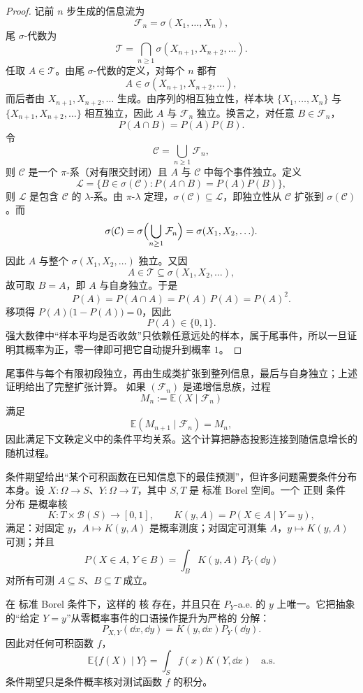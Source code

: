 \begin{proof}
记前 $n$ 步生成的信息流为
\[
\mathcal F_n=\sigma(X_1,\ldots,X_n),
\]
尾 $\sigma$-代数为
\[
\mathcal T=\bigcap_{n\ge1}\sigma(X_{n+1},X_{n+2},\ldots).
\]
任取 $A\in\mathcal T$。由尾 $\sigma$-代数的定义，对每个 $n$ 都有
\[
A\in\sigma(X_{n+1},X_{n+2},\ldots),
\]
而后者由 $X_{n+1},X_{n+2},\ldots$ 生成。由序列的相互独立性，样本块 $\{X_1,\ldots,X_n\}$ 与 $\{X_{n+1},X_{n+2},\ldots\}$ 相互独立，因此 $A$ 与 $\mathcal F_n$ 独立。换言之，对任意 $B\in\mathcal F_n$，
\[
P(A\cap B)=P(A)P(B).
\]
令
\[
\mathcal C=\bigcup_{n\ge1}\mathcal F_n,
\]
则 $\mathcal C$ 是一个 $\pi$-系（对有限交封闭）且 $A$ 与 $\mathcal C$ 中每个事件独立。定义
\[
\mathcal L=\{B\in\sigma(\mathcal C):P(A\cap B)=P(A)P(B)\},
\]
则 $\mathcal L$ 是包含 $\mathcal C$ 的 $\lambda$-系。由 $\pi$-$\lambda$ 定理，$\sigma(\mathcal C)\subseteq\mathcal L$，即独立性从 $\mathcal C$ 扩张到 $\sigma(\mathcal C)$。而
\[
\sigma(\mathcal C)
=\sigma\Bigl(\bigcup_{n\ge1}\mathcal F_n\Bigr)
=\sigma(X_1,X_2,\ldots).
\]
因此 $A$ 与整个 $\sigma(X_1,X_2,\ldots)$ 独立。又因
\[
A\in\mathcal T\subseteq\sigma(X_1,X_2,\ldots),
\]
故可取 $B=A$，即 $A$ 与自身独立。于是
\[
P(A)=P(A\cap A)=P(A)\,P(A)=P(A)^2.
\]
移项得 $P(A)\bigl(1-P(A)\bigr)=0$，因此
\[
P(A)\in\{0,1\}.
\]
强大数律中“样本平均是否收敛”只依赖任意远处的样本，属于尾事件，所以一旦证明其概率为正，零一律即可把它自动提升到概率 $1$。
\end{proof}

尾事件与每个有限初段独立，再由生成类扩张到整列信息，最后与自身独立；上述证明给出了完整扩张计算。
如果 $(\mathcal F_n)$ 是递增信息族，过程
\[
M_n:=\mathbb E(X\mid\mathcal F_n)
\]
满足
\[
\mathbb E(M_{n+1}\mid\mathcal F_n)=M_n,
\]
因此满足下文鞅定义中的条件平均关系。这个计算把静态投影连接到随信息增长的随机过程。

条件期望给出“某个可积函数在已知信息下的最佳预测”，但许多问题需要条件分布本身。设 $X:\Omega\to S$、$Y:\Omega\to T$，其中 $S,T$ 是 标准 Borel 空间。一个 正则 条件 分布 是概率核
\[
K:T\times\mathcal B(S)\to[0,1],
\qquad
K(y,A)=P(X\in A\mid Y=y),
\]
满足：对固定 $y$，$A\mapsto K(y,A)$ 是概率测度；对固定可测集 $A$，$y\mapsto K(y,A)$ 可测；并且
\begin{equation*}P(X\in A,\,Y\in B)
=\int_B K(y,A)\,P_Y(\dd y)\end{equation*}
对所有可测 $A\subseteq S$、$B\subseteq T$ 成立。

在 标准 Borel 条件下，这样的 核 存在，并且只在 $P_Y$-a.e. 的 $y$ 上唯一。它把抽象的“给定 $Y=y$”从零概率事件的口语操作提升为严格的 分解：
\begin{equation*}\boxed{
P_{X,Y}(\dd x,\dd y)
=K(y,\dd x)P_Y(\dd y).
}\end{equation*}
因此对任何可积函数 $f$，
\begin{equation*}\boxed{
\mathbb E\{f(X)\mid Y\}
=\int_S f(x)K(Y,\dd x)
\quad\text{a.s.}
}\end{equation*}
条件期望只是条件概率核对测试函数 $f$ 的积分。


